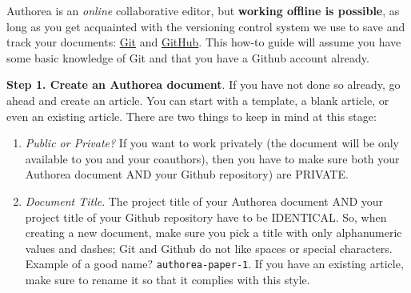 Authorea is an \textit{online} collaborative editor, but \textbf{working offline is possible}, as long as you get acquainted with the versioning control system we use to save and track your documents: \href{http://git-scm.com/}{Git} and \href{http://github.com/}{GitHub}. This how-to guide will assume you have some basic knowledge of Git and that you have a Github account already. 

\textbf{Step 1. Create an Authorea document}. If you have not done so already, go ahead and create an article. You can start with a template, a blank article, or even an existing article. There are two things to keep in mind at this stage:

\begin{enumerate}
\item \textit{Public or Private?} If you want to work privately (the document will be only available to you and your coauthors), then you have to make sure both your Authorea document AND your Github repository) are PRIVATE.
\item \textit{Document Title}. The project title of your Authorea document AND your project title of your Github repository have to be IDENTICAL. So, when creating a new document, make sure you pick a title with only alphanumeric values and dashes; Git and Github do not like spaces or special characters. Example of a good name? \verb|authorea-paper-1|. If you have an existing article, make sure to rename it so that it complies with this style.
\end{enumerate}
